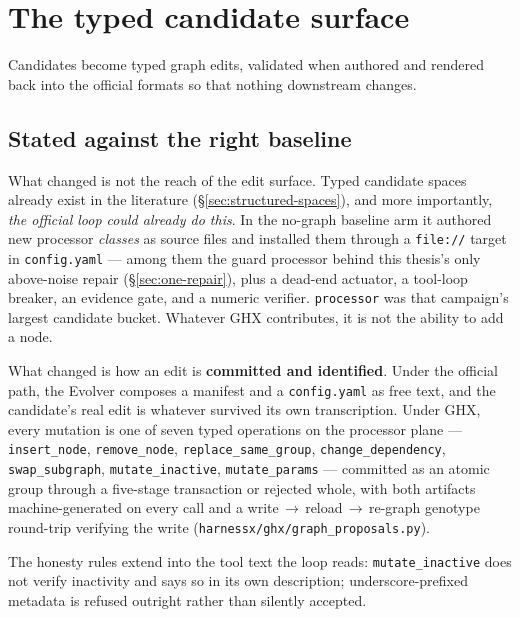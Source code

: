 \section{The typed candidate surface}
\label{sec:candidate-surface}

Candidates become typed graph edits, validated when authored and rendered
back into the official formats so that nothing downstream changes.

\subsection*{Stated against the right baseline}

What changed is not the reach of the edit surface. Typed candidate spaces
already exist in the literature (\S\ref{sec:structured-spaces}), and more
importantly, \emph{the official loop could already do this}. In the
no-graph baseline arm it authored new processor \emph{classes} as source
files and installed them through a \texttt{file://} target in
\texttt{config.yaml} --- among them the guard processor behind this
thesis's only above-noise repair (\S\ref{sec:one-repair}), plus a dead-end
actuator, a tool-loop breaker, an evidence gate, and a numeric verifier.
\texttt{processor} was that campaign's largest candidate bucket. Whatever
GHX contributes, it is not the ability to add a node.

What changed is how an edit is \textbf{committed and identified}. Under the
official path, the Evolver composes a manifest and a \texttt{config.yaml}
as free text, and the candidate's real edit is whatever survived its own
transcription. Under GHX, every mutation is one of seven typed operations
on the processor plane --- \texttt{insert\_node}, \texttt{remove\_node},
\texttt{replace\_same\_group}, \texttt{change\_dependency},
\texttt{swap\_subgraph}, \texttt{mutate\_inactive}, \texttt{mutate\_params}
--- committed as an atomic group through a five-stage transaction or
rejected whole, with both artifacts machine-generated on every call and a
write\,$\to$\,reload\,$\to$\,re-graph genotype round-trip verifying the
write (\texttt{harnessx/ghx/graph\_proposals.py}).

The honesty rules extend into the tool text the loop reads:
\texttt{mutate\_inactive} does not verify inactivity and says so in its own
description; underscore-prefixed metadata is refused outright rather than
silently accepted.

